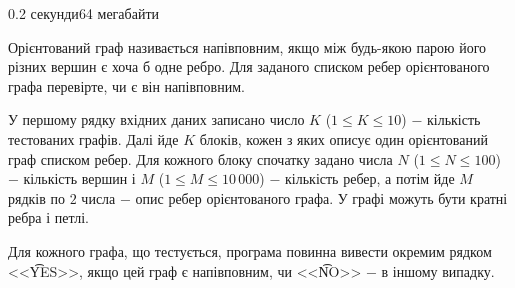 \begin{problem}{}{}{}{0.2 секунди}{64 мегабайти}

Орієнтований граф називається напівповним, якщо між будь-якою парою його різних вершин є хоча б одне ребро. 
Для заданого списком ребер орієнтованого графа перевірте, чи є він напівповним.

\InputFile
У першому рядку вхідних даних записано число $K$ ($1 \le K \le 10$) $-$ кількість тестованих графів. 
Далі йде $K$ блоків, кожен з яких описує один орієнтований граф списком ребер. 
Для кожного блоку спочатку задано числа $N$ ($1 \le N \le 100$) $-$ кількість вершин і $M$ ($1 \le M \le 10\,000$) $-$
кількість ребер, а потім йде $M$ рядків по $2$ числа $-$ опис ребер орієнтованого графа. У графі можуть бути кратні ребра
і петлі.

\OutputFile
Для кожного графа, що тестується, програма повинна вивести окремим рядком <<{\t{YES}}>>, якщо цей граф
є напівповним, чи <<{\t{NO}}>> $-$ в іншому випадку.

\Example

\begin{example}
%
\end{example}

\end{problem}

